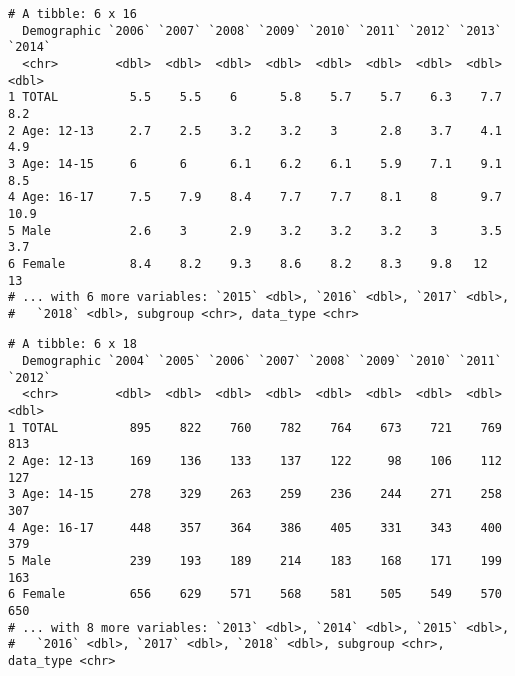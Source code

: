 \documentclass[
]{article}
\newenvironment{Shaded}{\begin{snugshade}}{\end{snugshade}}
\newcommand{\DataTypeTok}[1]{\textcolor[rgb]{0.13,0.29,0.53}{#1}}
\newcommand{\FloatTok}[1]{\textcolor[rgb]{0.00,0.00,0.81}{#1}}
\newcommand{\KeywordTok}[1]{\textcolor[rgb]{0.13,0.29,0.53}{\textbf{#1}}}
\newcommand{\NormalTok}[1]{#1}
\newcommand{\OperatorTok}[1]{\textcolor[rgb]{0.81,0.36,0.00}{\textbf{#1}}}
\newcommand{\StringTok}[1]{\textcolor[rgb]{0.31,0.60,0.02}{#1}}
\begin{document}
\begin{Shaded}
\end{Shaded}

\begin{verbatim}
# A tibble: 6 x 16
  Demographic `2006` `2007` `2008` `2009` `2010` `2011` `2012` `2013` `2014`
  <chr>        <dbl>  <dbl>  <dbl>  <dbl>  <dbl>  <dbl>  <dbl>  <dbl>  <dbl>
1 TOTAL          5.5    5.5    6      5.8    5.7    5.7    6.3    7.7    8.2
2 Age: 12-13     2.7    2.5    3.2    3.2    3      2.8    3.7    4.1    4.9
3 Age: 14-15     6      6      6.1    6.2    6.1    5.9    7.1    9.1    8.5
4 Age: 16-17     7.5    7.9    8.4    7.7    7.7    8.1    8      9.7   10.9
5 Male           2.6    3      2.9    3.2    3.2    3.2    3      3.5    3.7
6 Female         8.4    8.2    9.3    8.6    8.2    8.3    9.8   12     13  
# ... with 6 more variables: `2015` <dbl>, `2016` <dbl>, `2017` <dbl>,
#   `2018` <dbl>, subgroup <chr>, data_type <chr>
\end{verbatim}

\begin{Shaded}
\end{Shaded}

\begin{verbatim}
# A tibble: 6 x 18
  Demographic `2004` `2005` `2006` `2007` `2008` `2009` `2010` `2011` `2012`
  <chr>        <dbl>  <dbl>  <dbl>  <dbl>  <dbl>  <dbl>  <dbl>  <dbl>  <dbl>
1 TOTAL          895    822    760    782    764    673    721    769    813
2 Age: 12-13     169    136    133    137    122     98    106    112    127
3 Age: 14-15     278    329    263    259    236    244    271    258    307
4 Age: 16-17     448    357    364    386    405    331    343    400    379
5 Male           239    193    189    214    183    168    171    199    163
6 Female         656    629    571    568    581    505    549    570    650
# ... with 8 more variables: `2013` <dbl>, `2014` <dbl>, `2015` <dbl>,
#   `2016` <dbl>, `2017` <dbl>, `2018` <dbl>, subgroup <chr>, data_type <chr>
\end{verbatim}
\end{document}
